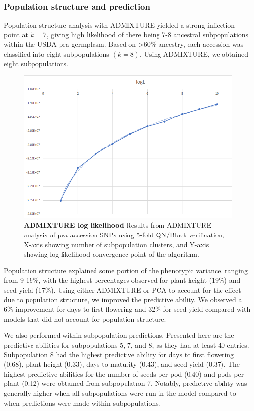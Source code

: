 \documentclass[12pt, letterpaper,oneocolumn]{article}
\begin{document}
	\subsubsection{Population structure and prediction}
	Population structure analysis with ADMIXTURE yielded a strong inflection point at $k=7$, giving high likelihood of there being 7-8 ancestral subpopulations within the USDA pea germplasm. Based on >60\% ancestry, each accession was classified into eight subpopulations $(k=8)$. Using ADMIXTURE, we obtained eight subpopulations.

\begin{center}
	\begin{figure}[H]
		\includegraphics[width=\linewidth]{logLplot.png}
		\caption{\textbf{ADMIXTURE log likelihood} Results from ADMIXTURE analysis of pea accession SNPs using 5-fold QN/Block verification, X-axis showing number of subpopulation clusters, and Y-axis showing log likelihood convergence point of the algorithm.}
	\end{figure}
\end{center}

	Population structure explained some portion of the phenotypic variance, ranging from 9-19\%, with the highest percentages observed for plant height (19\%) and seed yield (17\%). Using either ADMIXTURE or PCA to account for the effect due to population structure, we improved the predictive ability. We observed a 6\% improvement for days to first flowering and 32\% for seed yield compared with models that did not account for population structure.

        We also performed within-subpopulation predictions. Presented here are the predictive abilities	for subpopulations 5, 7, and 8, as they had at least 40 entries. Subpopulation 8 had the highest predictive ability for days to first flowering (0.68), plant height (0.33), days to maturity (0.43), and seed yield (0.37). The highest predictive abilities for the number of seeds per pod (0.40) and pods per plant (0.12) were obtained from subpopulation 7. Notably, predictive ability was generally higher when all subpopulations were run in the model compared to when predictions were made within subpopulations.
\end{document}
